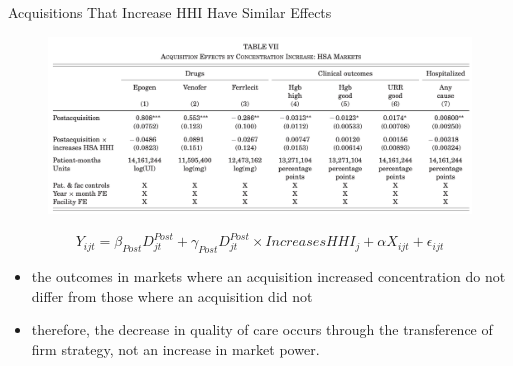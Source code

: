 \begin{frame}{Acquisitions That Increase HHI Have Similar Effects}
    \begin{figure}
        \centering
        \includegraphics[width=0.8\linewidth]{tb7.png}
    \end{figure}
     $$Y_{ijt} = \beta_{Post}D^{Post}_{jt} + \gamma_{Post}D^{Post}_{jt}\times IncreasesHHI_{j} + \alpha X_{ijt} + \epsilon_{ijt} $$
    \begin{itemize}
        \item the outcomes in markets where an acquisition increased concentration do not differ from those where an acquisition did not
        \item therefore, the decrease in quality of care occurs through the transference of firm strategy, not an increase in market power.
    \end{itemize}

\end{frame}